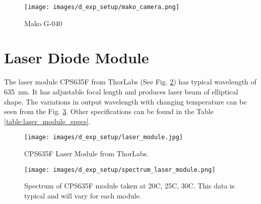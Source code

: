     \begin{figure}[h]
        \centering
        \texttt{[image: images/d\_exp\_setup/mako\_camera.png]}
        \caption{Mako G-040 \cite{mako_camera}}
        \label{fig:mako_camera.png}
    \end{figure}

\clearpage

\section{Laser Diode Module}
    The laser module CPS635F from ThorLabs (See Fig. \ref{fig:laser_module.jpg}) has typical wavelength of \SI{635}{\nano\meter}. It has adjustable focal length and produces laser beam of elliptical shape. The variations in output wavelength with changing temperature can be seen from the Fig. \ref{fig:spectrum_laser_module.png}. Other specifications can be found in the Table \ref{table:laser_module_specs}.

    \begin{figure}[h]
        \centering
        \texttt{[image: images/d\_exp\_setup/laser\_module.jpg]}
        \caption{CPS635F Laser Module from ThorLabs. \cite{thorlabs_laser}}
        \label{fig:laser_module.jpg}
    \end{figure}

    \begin{figure}[h]
        \centering
        \texttt{[image: images/d\_exp\_setup/spectrum\_laser\_module.png]}
        \caption{Spectrum of CPS635F module taken at 20\textdegree{}C, 25\textdegree{}C, 30\textdegree{}C. This data is typical and will vary for each module. \cite{thorlabs_laser}}
        \label{fig:spectrum_laser_module.png}
    \end{figure}

